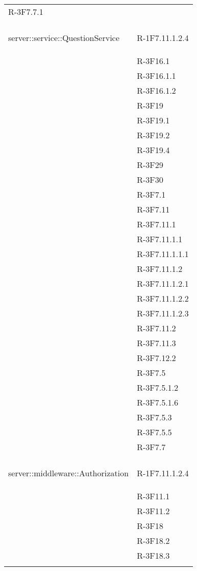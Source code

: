 \begin{longtable}{l p{3cm}}
	R-3F7.7.1 \tabularnewline &\tabularnewline
	\hline
	\hypertarget{server::service::QuestionService}{server::service::QuestionService} & R-1F7.11.1.2.4 \tabularnewline &
	
	R-3F16.1 \tabularnewline &
	
	R-3F16.1.1 \tabularnewline &
	
	R-3F16.1.2 \tabularnewline &
	
	R-3F19 \tabularnewline &
	
	R-3F19.1 \tabularnewline &
	
	R-3F19.2 \tabularnewline &
	
	R-3F19.4 \tabularnewline &
	
	R-3F29 \tabularnewline &
	
	R-3F30 \tabularnewline &
	
	R-3F7.1 \tabularnewline &
	
	R-3F7.11 \tabularnewline &
	
	R-3F7.11.1 \tabularnewline &
	
	R-3F7.11.1.1 \tabularnewline &
	
	R-3F7.11.1.1.1 \tabularnewline &
	
	R-3F7.11.1.2 \tabularnewline &
	
	R-3F7.11.1.2.1 \tabularnewline &
	
	R-3F7.11.1.2.2 \tabularnewline &
	
	R-3F7.11.1.2.3 \tabularnewline &
	
	R-3F7.11.2 \tabularnewline &
	
	R-3F7.11.3 \tabularnewline &
	
	R-3F7.12.2 \tabularnewline &
	
	R-3F7.5 \tabularnewline &
	
	R-3F7.5.1.2 \tabularnewline &
	
	R-3F7.5.1.6 \tabularnewline &
	
	R-3F7.5.3 \tabularnewline &
	
	R-3F7.5.5 \tabularnewline &
	
	R-3F7.7 \tabularnewline &\tabularnewline
	\hline
	\hypertarget{server::middleware::Authorization}{server::middleware::Authorization} & R-1F7.11.1.2.4 \tabularnewline &
	
	R-3F11.1 \tabularnewline &
	
	R-3F11.2 \tabularnewline &
	
	R-3F18 \tabularnewline &
	
	R-3F18.2 \tabularnewline &
	
	R-3F18.3 \tabularnewline &
	

\end{longtable}
